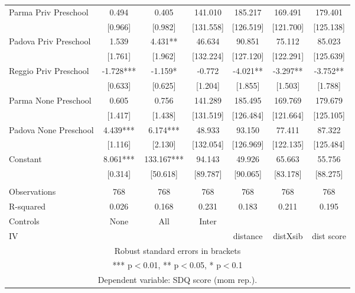 \begin{tabular}{lcccccc}
Parma Priv Preschool & 0.494 & 0.405 & 141.010 & 185.217 & 169.491 & 179.401 \\
 & [0.966] & [0.982] & [131.558] & [126.519] & [121.700] & [125.138] \\
Padova Priv Preschool & 1.539 & 4.431** & 46.634 & 90.851 & 75.112 & 85.023 \\
 & [1.761] & [1.962] & [132.224] & [127.120] & [122.291] & [125.639] \\
Reggio Priv Preschool & -1.728*** & -1.159* & -0.772 & -4.021** & -3.297** & -3.752** \\
 & [0.633] & [0.625] & [1.204] & [1.855] & [1.503] & [1.788] \\
Parma None Preschool & 0.605 & 0.756 & 141.289 & 185.495 & 169.769 & 179.679 \\
 & [1.417] & [1.438] & [131.519] & [126.484] & [121.664] & [125.105] \\
Padova None Preschool & 4.439*** & 6.174*** & 48.933 & 93.150 & 77.411 & 87.322 \\
 & [1.116] & [2.130] & [132.054] & [126.969] & [122.135] & [125.484] \\
Constant & 8.061*** & 133.167*** & 94.143 & 49.926 & 65.663 & 55.756 \\
 & [0.314] & [50.618] & [89.787] & [90.065] & [83.178] & [88.275] \\
 &  &  &  &  &  &  \\
Observations & 768 & 768 & 768 & 768 & 768 & 768 \\
R-squared & 0.026 & 0.168 & 0.231 & 0.183 & 0.211 & 0.195 \\
Controls & None & All & Inter &  &  &  \\
 IV &  &  &  & distance & distXsib & dist score \\ \hline
\multicolumn{7}{c}{ Robust standard errors in brackets} \\
\multicolumn{7}{c}{ *** p$<$0.01, ** p$<$0.05, * p$<$0.1} \\
\multicolumn{7}{c}{ Dependent variable: SDQ score (mom rep.).} \\
\end{tabular}
